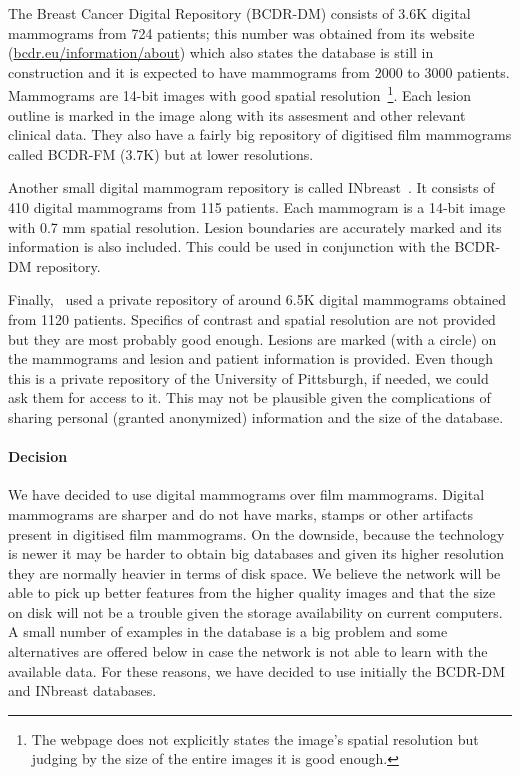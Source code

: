 \documentclass[11pt]{article}
\begin{document}
	The Breast Cancer Digital Repository (BCDR-DM) consists of 3.6K digital mammograms from 724 patients; this number was obtained from its website (\url{bcdr.eu/information/about}) which also states the database is still in construction and it is expected to have mammograms from 2000 to 3000 patients. Mammograms are 14-bit images with good spatial resolution~\footnote{The webpage does not explicitly states the image's spatial resolution but judging by the size of the entire images it is good enough.}. Each lesion outline is marked in the image along with its assesment and other relevant clinical data. They also have a fairly big repository of digitised film mammograms called BCDR-FM (3.7K) but at lower resolutions.

	Another small digital mammogram repository is called INbreast~\cite{Moreira2012}. It consists of 410 digital mammograms from 115 patients. Each mammogram is a 14-bit image with 0.7 mm spatial resolution. Lesion boundaries are accurately marked and its information is also included. This could be used in conjunction with the BCDR-DM repository.

	Finally,~\cite{Zheng2012} used a private repository of around 6.5K digital mammograms obtained from 1120 patients. Specifics of contrast and spatial resolution are not provided but they are most probably good enough. Lesions are marked (with a circle) on the mammograms and lesion and patient information is provided. Even though this is a private repository of the University of Pittsburgh, if needed, we could ask them for access to it. This may not be plausible given the complications of sharing personal (granted anonymized) information and the size of the database.


\paragraph{Decision}
We have decided to use digital mammograms over film mammograms. Digital mammograms are sharper and do not have marks, stamps or other artifacts present in digitised film mammograms. On the downside, because the technology is newer it may be harder to obtain big databases and given its higher resolution they are normally heavier in terms of disk space. We believe the network will be able to pick up better features from the higher quality images and that the size on disk will not be a trouble given the storage availability on current computers. A small number of examples in the database is a big problem and some alternatives are offered below in case the network is not able to learn with the available data. For these reasons, we have decided to use initially the BCDR-DM and INbreast databases.
\end{document}
